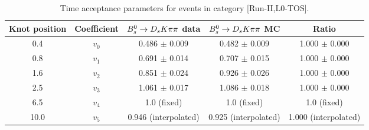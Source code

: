 \begin{table}[hp!]
\centering
\small
\caption{Time acceptance parameters for events in category [\textsf{Run-II},\textsf{L0-TOS}].}
\begin{tabular}{c c c c c}
\hline
\hline
Knot position & Coefficient & ${{B}^0_{s}}\rightarrow{\ensuremath{{D}_{s}}}{\ensuremath{K}}{\ensuremath{\pi}}{\ensuremath{\pi}}$ data & ${{B}^0_{s}}\rightarrow{\ensuremath{{D}_{s}}}{\ensuremath{K}}{\ensuremath{\pi}}{\ensuremath{\pi}}$ MC & Ratio \\
\hline
0.4 & $v_{0}$ & 0.486 $\pm$ 0.009 & 0.482 $\pm$ 0.009 & 1.000 $\pm$ 0.000\\
0.8 & $v_{1}$ & 0.691 $\pm$ 0.014 & 0.707 $\pm$ 0.015 & 1.000 $\pm$ 0.000\\
1.6 & $v_{2}$ & 0.851 $\pm$ 0.024 & 0.926 $\pm$ 0.026 & 1.000 $\pm$ 0.000\\
2.5 & $v_{3}$ & 1.061 $\pm$ 0.017 & 1.086 $\pm$ 0.018 & 1.000 $\pm$ 0.000\\
6.5 & $v_{4}$ &  1.0 (fixed) & 1.0 (fixed) & 1.0 (fixed)\\
10.0 & $v_{5}$ & 0.946 (interpolated) & 0.925 (interpolated) & 1.000 (interpolated) \\
\hline
\hline
\end{tabular}
\label{table:splines}
\end{table}